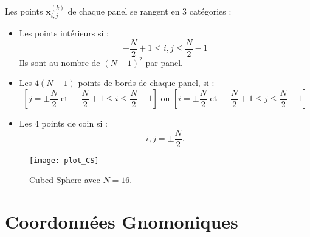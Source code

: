 Les points $\mathbf{x}_{i,j}^{(k)}$ de chaque panel se rangent en 3 catégories :
\begin{itemize}
\item Les points intérieurs si :
\begin{equation}
- \dfrac{N}{2}+1 \leq i,j \leq \dfrac{N}{2}-1
\end{equation}
Ils sont au nombre de $(N-1)^2$ par panel.
\item Les $4(N-1)$ points de bords de chaque panel, si :
\begin{equation}
\left[ j=\pm \dfrac{N}{2} \text{ et } - \dfrac{N}{2}+1 \leq i \leq \dfrac{N}{2}-1 \right] \text{ ou } \left[ i=\pm \dfrac{N}{2} \text{ et } - \dfrac{N}{2}+1 \leq j \leq \dfrac{N}{2}-1 \right]
\end{equation}
\item Les $4$ points de coin si :
\begin{equation}
i, j = \pm \dfrac{N}{2}.
\end{equation}
\end{itemize}



\begin{figure}
\begin{center}
\texttt{[image: plot\_CS]}
\end{center}
\caption{Cubed-Sphere avec $N=16$.}
\end{figure}















\section{Coordonnées Gnomoniques}
\label{sec:gnomonique}

